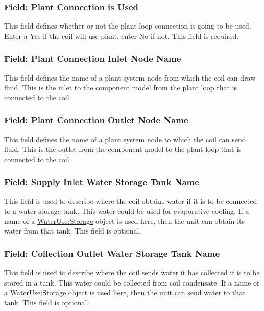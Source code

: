 \subsubsection{Field: Plant Connection is Used}\label{field-plant-connection-is-used}

This field defines whether or not the plant loop connection is going to be used. Enter a Yes if the coil will use plant, enter No if not. This field is required.

\subsubsection{Field: Plant Connection Inlet Node Name}\label{field-plant-connection-inlet-node-name}

This field defines the name of a plant system node from which the coil can draw fluid. This is the inlet to the component model from the plant loop that is connected to the coil.

\subsubsection{Field: Plant Connection Outlet Node Name}\label{field-plant-connection-outlet-node-name}

This field defines the name of a plant system node to which the coil can send fluid. This is the outlet from the component model to the plant loop that is connected to the coil.

\subsubsection{Field: Supply Inlet Water Storage Tank Name}\label{field-supply-inlet-water-storage-tank-name-2}

This field is used to describe where the coil obtains water if it is to be connected to a water storage tank. This water could be used for evaporative cooling. If a name of a \hyperref[waterusestorage]{WaterUse:Storage} object is used here, then the unit can obtain its water from that tank. This field is optional.

\subsubsection{Field: Collection Outlet Water Storage Tank Name}\label{field-collection-outlet-water-storage-tank-name-2}

This field is used to describe where the coil sends water it has collected if is to be stored in a tank. This water could be collected from coil condensate. If a name of a \hyperref[waterusestorage]{WaterUse:Storage} object is used here, then the unit can send water to that tank. This field is optional.

